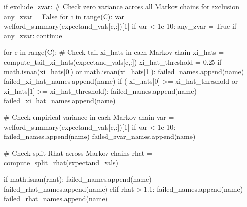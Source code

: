 \documentclass[
  letterpaper,
  DIV=11,
  numbers=noendperiod]{scrartcl}
\newenvironment{Shaded}{\begin{snugshade}}{\end{snugshade}}
\newcommand{\BuiltInTok}[1]{\textcolor[rgb]{0.00,0.23,0.31}{#1}}
\newcommand{\CommentTok}[1]{\textcolor[rgb]{0.37,0.37,0.37}{#1}}
\newcommand{\ControlFlowTok}[1]{\textcolor[rgb]{0.00,0.23,0.31}{#1}}
\newcommand{\DecValTok}[1]{\textcolor[rgb]{0.68,0.00,0.00}{#1}}
\newcommand{\FloatTok}[1]{\textcolor[rgb]{0.68,0.00,0.00}{#1}}
\newcommand{\KeywordTok}[1]{\textcolor[rgb]{0.00,0.23,0.31}{#1}}
\newcommand{\NormalTok}[1]{\textcolor[rgb]{0.00,0.23,0.31}{#1}}
\newcommand{\OperatorTok}[1]{\textcolor[rgb]{0.37,0.37,0.37}{#1}}
\newcommand{\VariableTok}[1]{\textcolor[rgb]{0.07,0.07,0.07}{#1}}
\begin{document}
\begin{Shaded}
\begin{Highlighting}[]
    \ControlFlowTok{if}\NormalTok{ exclude\_zvar:}
      \CommentTok{\# Check zero variance across all Markov chains for exclusion}
\NormalTok{      any\_zvar }\OperatorTok{=} \VariableTok{False}
      \ControlFlowTok{for}\NormalTok{ c }\KeywordTok{in} \BuiltInTok{range}\NormalTok{(C):}
\NormalTok{        var }\OperatorTok{=}\NormalTok{ welford\_summary(expectand\_vals[c,:])[}\DecValTok{1}\NormalTok{]}
        \ControlFlowTok{if}\NormalTok{ var }\OperatorTok{\textless{}} \FloatTok{1e{-}10}\NormalTok{:}
\NormalTok{          any\_zvar }\OperatorTok{=} \VariableTok{True}
      \ControlFlowTok{if}\NormalTok{ any\_zvar:}
        \ControlFlowTok{continue}

    \ControlFlowTok{for}\NormalTok{ c }\KeywordTok{in} \BuiltInTok{range}\NormalTok{(C):}
      \CommentTok{\# Check tail xi\_hats in each Markov chain}
\NormalTok{      xi\_hats }\OperatorTok{=}\NormalTok{ compute\_tail\_xi\_hats(expectand\_vals[c,:])}
\NormalTok{      xi\_hat\_threshold }\OperatorTok{=} \FloatTok{0.25}
      \ControlFlowTok{if}\NormalTok{ math.isnan(xi\_hats[}\DecValTok{0}\NormalTok{]) }\KeywordTok{or}\NormalTok{ math.isnan(xi\_hats[}\DecValTok{1}\NormalTok{]):}
\NormalTok{        failed\_names.append(name)}
\NormalTok{        failed\_xi\_hat\_names.append(name)}
      \ControlFlowTok{if}\NormalTok{ (   xi\_hats[}\DecValTok{0}\NormalTok{] }\OperatorTok{\textgreater{}=}\NormalTok{ xi\_hat\_threshold}
          \KeywordTok{or}\NormalTok{ xi\_hats[}\DecValTok{1}\NormalTok{] }\OperatorTok{\textgreater{}=}\NormalTok{ xi\_hat\_threshold):}
\NormalTok{        failed\_names.append(name)}
\NormalTok{        failed\_xi\_hat\_names.append(name)}

      \CommentTok{\# Check empirical variance in each Markov chain}
\NormalTok{      var }\OperatorTok{=}\NormalTok{ welford\_summary(expectand\_vals[c,:])[}\DecValTok{1}\NormalTok{]}
      \ControlFlowTok{if}\NormalTok{ var }\OperatorTok{\textless{}} \FloatTok{1e{-}10}\NormalTok{:}
\NormalTok{        failed\_names.append(name)}
\NormalTok{        failed\_zvar\_names.append(name)}

    \CommentTok{\# Check split Rhat across Markov chains}
\NormalTok{    rhat }\OperatorTok{=}\NormalTok{ compute\_split\_rhat(expectand\_vals)}

    \ControlFlowTok{if}\NormalTok{ math.isnan(rhat):}
\NormalTok{      failed\_names.append(name)}
\NormalTok{      failed\_rhat\_names.append(name)}
    \ControlFlowTok{elif}\NormalTok{ rhat }\OperatorTok{\textgreater{}} \FloatTok{1.1}\NormalTok{:}
\NormalTok{      failed\_names.append(name)}
\NormalTok{      failed\_rhat\_names.append(name)}


\end{Highlighting}
\end{Shaded}
\end{document}
